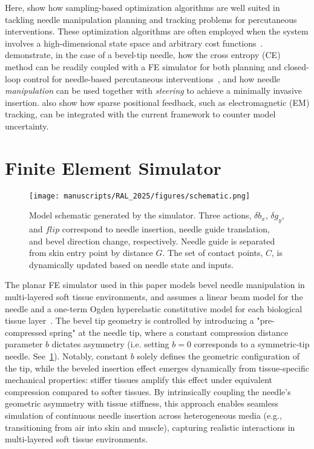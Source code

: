 Here,  show how sampling-based optimization algorithms are well suited in tackling needle manipulation planning and tracking problems for percutaneous interventions. These optimization algorithms are often employed when the system involves a high-dimensional state space and arbitrary cost functions~\parencite{kobilarovCrossEntropyMotionPlanning2012,petrovicCrossEntropyBasedStochastic2020,taoPathPlanningUncertain2022,suhFastSamplingBasedCostAware2017}.  demonstrate, in the case of a bevel-tip needle, how the cross entropy (CE) method can be readily coupled with a FE simulator for both planning and closed-loop control for needle-based percutaneous interventions~\parencite{wangBevelTipNeedleDeflection2024}, and how needle \textit{manipulation} can be used together with \textit{steering} to achieve a minimally invasive insertion.  also show how sparse positional feedback, such as electromagnetic (EM) tracking, can be integrated with the current framework to counter model uncertainty.

\section{Finite Element Simulator}
\label{sec:chap-5-fe-simulator}

\begin{figure}[h]
  \centering
  \texttt{[image: manuscripts/RAL\_2025/figures/schematic.png]}
  \caption{Model schematic generated by the simulator. Three actions, $\delta b_x$, $\delta g_y$, and $flip$ correspond to needle insertion, needle guide translation, and bevel direction change, respectively. Needle guide is separated from skin entry point by distance $G$. The set of contact points, $C$, is dynamically updated based on needle state and inputs.}
  \label{fig:chap-5-simulator}
\end{figure}

The planar FE simulator used in this paper models bevel needle manipulation in multi-layered soft tissue environments, and assumes a linear beam model for the needle and a one-term Ogden hyperelastic constitutive model for each biological tissue layer~\parencite{wangFlexibleNeedleBending2023,wangBevelTipNeedleDeflection2024}. The bevel tip geometry is controlled by introducing a "pre-compressed spring" at the needle tip, where a constant compression distance parameter $b$ dictates asymmetry (i.e. setting $b = 0$ corresponds to a symmetric-tip needle. See~\cref{fig:chap-5-simulator}). Notably, constant $b$ solely defines the geometric configuration of the tip, while the beveled insertion effect emerges dynamically from tissue-specific mechanical properties: stiffer tissues amplify this effect under equivalent compression compared to softer tissues. By intrinsically coupling the needle’s geometric asymmetry with tissue stiffness, this approach enables seamless simulation of continuous needle insertion across heterogeneous media (e.g., transitioning from air into skin and muscle), capturing realistic interactions in multi-layered soft tissue environments.

